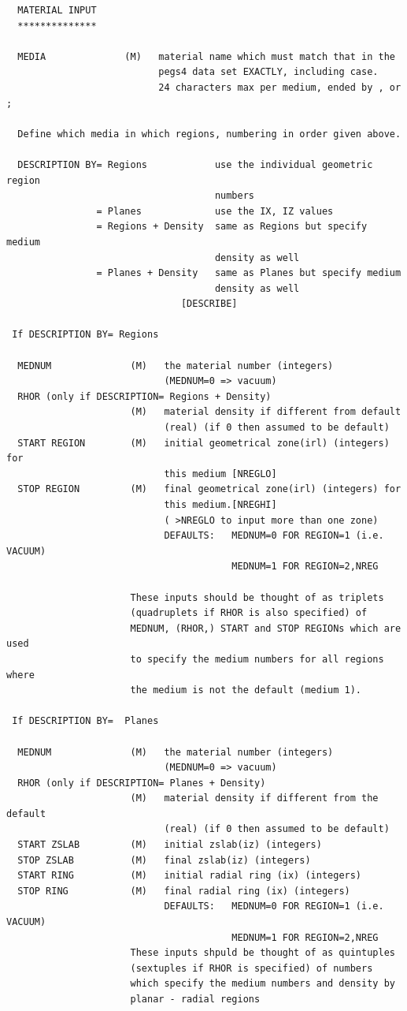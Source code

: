 \documentclass[12pt,twoside]{article}  %
\begin{document}
\begin{verbatim}
  MATERIAL INPUT
  **************

  MEDIA              (M)   material name which must match that in the
                           pegs4 data set EXACTLY, including case.
                           24 characters max per medium, ended by , or ;

  Define which media in which regions, numbering in order given above.

  DESCRIPTION BY= Regions            use the individual geometric region
                                     numbers
                = Planes             use the IX, IZ values
                = Regions + Density  same as Regions but specify medium
                                     density as well
                = Planes + Density   same as Planes but specify medium
                                     density as well
                               [DESCRIBE]

 If DESCRIPTION BY= Regions

  MEDNUM              (M)   the material number (integers)
                            (MEDNUM=0 => vacuum)
  RHOR (only if DESCRIPTION= Regions + Density)
                      (M)   material density if different from default
                            (real) (if 0 then assumed to be default)
  START REGION        (M)   initial geometrical zone(irl) (integers) for
                            this medium [NREGLO]
  STOP REGION         (M)   final geometrical zone(irl) (integers) for
                            this medium.[NREGHI]
                            ( >NREGLO to input more than one zone)
                            DEFAULTS:   MEDNUM=0 FOR REGION=1 (i.e. VACUUM)
                                        MEDNUM=1 FOR REGION=2,NREG

                      These inputs should be thought of as triplets
                      (quadruplets if RHOR is also specified) of
                      MEDNUM, (RHOR,) START and STOP REGIONs which are used
                      to specify the medium numbers for all regions where
                      the medium is not the default (medium 1).
                                                                    
 If DESCRIPTION BY=  Planes

  MEDNUM              (M)   the material number (integers)
                            (MEDNUM=0 => vacuum)
  RHOR (only if DESCRIPTION= Planes + Density)
                      (M)   material density if different from the default
                            (real) (if 0 then assumed to be default)
  START ZSLAB         (M)   initial zslab(iz) (integers)
  STOP ZSLAB          (M)   final zslab(iz) (integers)
  START RING          (M)   initial radial ring (ix) (integers)
  STOP RING           (M)   final radial ring (ix) (integers)
                            DEFAULTS:   MEDNUM=0 FOR REGION=1 (i.e. VACUUM)
                                        MEDNUM=1 FOR REGION=2,NREG
                      These inputs shpuld be thought of as quintuples
                      (sextuples if RHOR is specified) of numbers
                      which specify the medium numbers and density by
                      planar - radial regions 
\end{verbatim}
\end{document}
